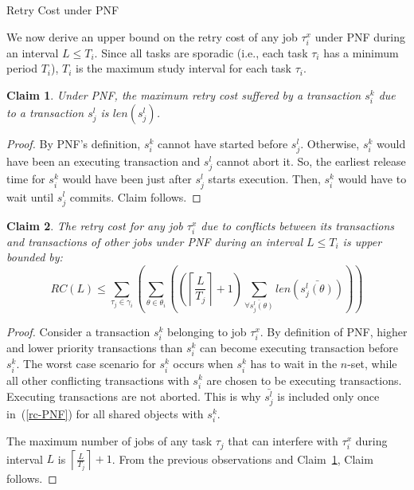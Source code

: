 \documentclass[twocolumn]{article}
\makeatletter
\def\section{\@startsection {section}{1}{\z@}{20pt plus 2pt minus 2pt}
{8pt plus 2pt minus 2pt}{\centering\normalsize\sc
\edef\@svsec{\thesection.\ }}}
\def\thesection{\Roman{section}}
\newtheorem{clm}{Claim}
\newtheorem{proof}{Proof}
\makeatother
\begin{document}
\section{Retry Cost under PNF}\label{rc pnf sec}

We now derive an upper bound on the retry cost of any job $\tau_i^x$ under PNF during an interval $L\le T_i$. Since all tasks are sporadic (i.e., each task $\tau_i$ has a minimum period $T_i$), $T_i$ is the maximum study interval for each task $\tau_i$.

\begin{clm}\label{two transactions retry cost PNF}
Under PNF, the maximum retry cost suffered by a transaction $s_{i}^{k}$ due 
to a transaction $s_{j}^{l}$ is $len(s_{j}^{l})$.
\end{clm}
\begin{proof}\normalfont
By PNF's definition, $s_{i}^{k}$ cannot have started before
$s_{j}^{l}$. Otherwise, $s_i^k$ would have been an executing transaction and $s_{j}^{l}$ cannot abort it. So, the earliest release time for $s_{i}^{k}$ would have been just after $s_{j}^{l}$ starts execution. Then, $s_i^k$ would have to wait until $s_{j}^{l}$
commits. Claim follows.
\end{proof}

\begin{clm}
The retry cost for any job $\tau_{i}^{x}$ due to conflicts between its transactions and transactions of other jobs under PNF during an interval $L\le T_{i}$ is upper bounded by:
\begin{equation}
RC(L)\le\sum_{\tau_{j}\in\gamma_{i}}\left(\sum_{\theta\in\theta_{i}}\left(\left(\left\lceil \frac{L}{T_{j}}\right\rceil +1\right)\sum_{\bar{\forall s_{j}^{l}(\theta)}}len\left(\bar{s_{j}^{l}(\theta)}\right)\right)\right)\label{rc-PNF}
\end{equation}
\end{clm}

\begin{proof}\normalfont
Consider a transaction $s_{i}^{k}$ belonging to job $\tau_{i}^{x}$. By definition of PNF, higher and lower priority transactions than $s_i^k$ can become executing transaction before $s_i^k$. 
 The worst case scenario for $s_{i}^{k}$ occurs when $s_i^k$ has to wait in the $n$-set, while all other conflicting transactions with $s_i^k$ are chosen to be executing transactions. Executing transactions are not aborted. This is why $\bar{s_j^l}$ is included only once in~(\ref{rc-PNF}) for all shared objects with $s_i^k$.

The maximum number of jobs of any task $\tau_{j}$ that can interfere with $\tau_{i}^{x}$ during interval $L$ is $\left\lceil \frac{L}{T_{j}}\right\rceil +1$. From  the previous observations and Claim~\ref{two transactions retry cost PNF}, Claim follows.
\end{proof}
\end{document}
